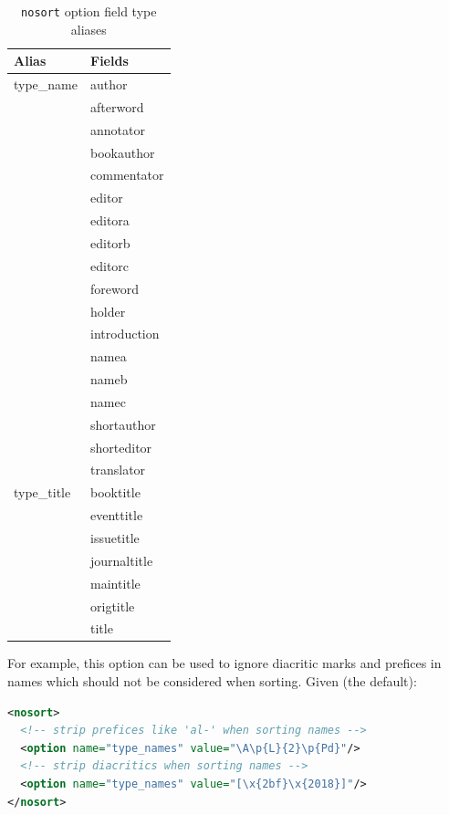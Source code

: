 \documentclass{ltxdockit}
\begin{document}
\begin{table}
\begin{center}
\small
\begin{tabular}{ll}
\toprule
Alias & Fields\\
\midrule
type\_name & author\\
          & afterword\\
          & annotator\\
          & bookauthor\\
          & commentator\\
          & editor\\
          & editora\\
          & editorb\\
          & editorc\\
          & foreword\\
          & holder\\
          & introduction\\
          & namea\\
          & nameb\\
          & namec\\
          & shortauthor\\
          & shorteditor\\
          & translator\\
type\_title & booktitle\\
           & eventtitle\\
           & issuetitle\\
           & journaltitle\\
           & maintitle\\
           & origtitle\\
           & title\\
\bottomrule
\end{tabular}
\end{center}
\caption{\texttt{nosort} option field type aliases}
\label{tab:nst}
\end{table}

For example, this option can be used to ignore diacritic marks and prefices
in names which should not be considered when sorting. Given (the default):

\begin{lstlisting}[language=xml]
<nosort>
  <!-- strip prefices like 'al-' when sorting names -->
  <option name="type_names" value="\A\p{L}{2}\p{Pd}"/>
  <!-- strip diacritics when sorting names -->
  <option name="type_names" value="[\x{2bf}\x{2018}]"/>
</nosort>
\end{lstlisting}
\end{document}
